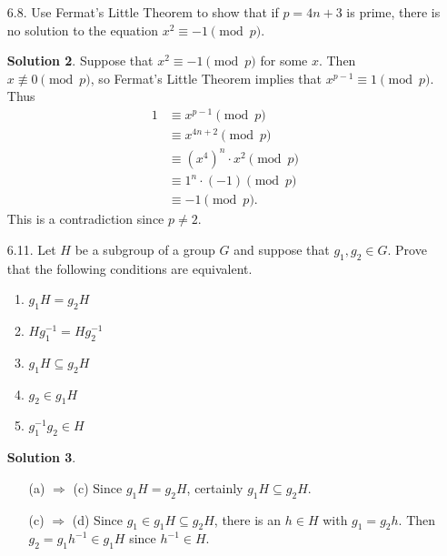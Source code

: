 \documentclass{article}
\theoremstyle{definition}
\newtheorem*{solution}{Solution}
\begin{document}
\begin{enumerate}
\begin{solution}
Since $(12) \not\in D_4$,
\[
(12)D_4 = \{(12), (234), (1324), (143), (34), (1423), (132), (124)\}
\]
is another left coset of $D_4$.  Moreover, since $g_1H = g_2H \Leftrightarrow Hg_1^{-1} = Hg_2^{-1}$, the set consisting of the inverses of these elements is a right coset of $D_4$:
\[
D_4(12) = \{(12), (243), (1423), (134), (34), (1324), (123), (142)\}
\]
Finally, we can construct the remaining left coset by collecting the remaining elements,
\[
(14)D_4 = \{(14), (23), (123), (142), (134), (243), (1243), (1342)\},
\]
and the remaining right coset likewise:
\[
D_4(14) = \{(14), (23), (132), (124), (143), (234), (1342), (1243)\}.
\]
\end{solution}
\item[6.8.] Use Fermat's Little Theorem to show that if $p=4n+3$ is prime, there is no solution to the equation $x^2 \equiv -1 \pmod{p}$.
\begin{solution}
Suppose that $x^2 \equiv -1 \pmod{p}$ for some $x$.  Then $x \not\equiv 0 \pmod{p}$, so Fermat's Little Theorem implies that $x^{p-1} \equiv 1 \pmod{p}$.  Thus
\begin{align*}
1 &\equiv x^{p-1} \pmod{p} \\
&\equiv x^{4n+2} \pmod{p} \\
&\equiv (x^4)^n \cdot x^2 \pmod{p} \\
&\equiv 1^n \cdot (-1) \pmod{p} \\
&\equiv -1 \pmod{p}.
\end{align*}
This is a contradiction since $p \ne 2$.
\end{solution}
\item[6.11.] Let $H$ be a subgroup of a group $G$ and suppose that $g_1, g_2 \in G$.  Prove that the following conditions are equivalent.
\begin{enumerate}
\item $g_1H = g_2H$
\item $Hg_1^{-1} = Hg_2^{-1}$
\item $g_1H \subseteq g_2H$
\item $g_2 \in g_1H$
\item $g_1^{-1}g_2 \in H$
\end{enumerate}
\begin{solution} $ $
\begin{enumerate}
\item[(a) $\Rightarrow$ (c)] Since $g_1H = g_2H$, certainly $g_1H \subseteq g_2H$.
\item[(c) $\Rightarrow$ (d)] Since $g_1 \in g_1H \subseteq g_2H$, there is an $h \in H$ with $g_1 = g_2h$.  Then $g_2 = g_1h^{-1} \in g_1H$ since $h^{-1} \in H$.

\end{enumerate}
\end{solution}
\end{enumerate}
\end{document}
